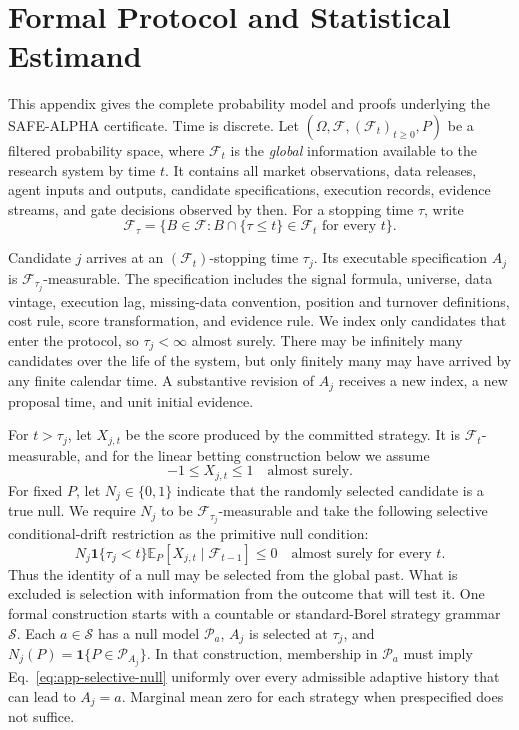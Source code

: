 \section{Formal Protocol and Statistical Estimand}
\label{app:formal}

This appendix gives the complete probability model and proofs underlying the
SAFE-ALPHA certificate.  Time is discrete.  Let
\((\Omega,\mathcal F,(\mathcal F_t)_{t\geq 0},P)\) be a filtered probability
space, where \(\mathcal F_t\) is the \emph{global} information available to
the research system by time \(t\).  It contains all market observations,
data releases, agent inputs and outputs, candidate specifications, execution
records, evidence streams, and gate decisions observed by then.  For a
stopping time \(\tau\), write
\[
  \mathcal F_\tau
  =\{B\in\mathcal F:B\cap\{\tau\leq t\}\in\mathcal F_t
    \text{ for every }t\}.
\]

Candidate \(j\) arrives at an \((\mathcal F_t)\)-stopping time \(\tau_j\).
Its executable specification \(A_j\) is
\(\mathcal F_{\tau_j}\)-measurable.  The specification includes the signal
formula, universe, data vintage, execution lag, missing-data convention,
position and turnover definitions, cost rule, score transformation, and
evidence rule.  We index only candidates that enter the protocol, so
\(\tau_j<\infty\) almost surely.  There may be infinitely many candidates
over the life of the system, but only finitely many may have arrived by any
finite calendar time.  A substantive revision of \(A_j\) receives a new
index, a new proposal time, and unit initial evidence.

For \(t>\tau_j\), let \(X_{j,t}\) be the score produced by the committed
strategy.  It is \(\mathcal F_t\)-measurable, and for the linear betting
construction below we assume
\begin{equation}
  -1\leq X_{j,t}\leq 1\quad\text{almost surely}.
  \label{eq:app-bounded}
\end{equation}
For fixed \(P\), let \(N_j\in\{0,1\}\) indicate that the randomly selected
candidate is a true null.  We require \(N_j\) to be
\(\mathcal F_{\tau_j}\)-measurable and take the following selective
conditional-drift restriction as the primitive null condition:
\begin{equation}
  N_j\mathbf 1\{\tau_j<t\}
  \mathbb E_P[X_{j,t}\mid\mathcal F_{t-1}]\leq 0
  \quad\text{almost surely for every }t.
  \label{eq:app-selective-null}
\end{equation}
Thus the identity of a null may be selected from the global past.  What is
excluded is selection with information from the outcome that will test it.
One formal construction starts with a countable or standard-Borel strategy
grammar \(\mathcal S\).  Each \(a\in\mathcal S\) has a null model
\(\mathcal P_a\), \(A_j\) is selected at \(\tau_j\), and
\(N_j(P)=\mathbf 1\{P\in\mathcal P_{A_j}\}\).  In that construction,
membership in \(\mathcal P_a\) must imply
Eq.~\eqref{eq:app-selective-null} uniformly over every admissible adaptive
history that can lead to \(A_j=a\).  Marginal mean zero for each strategy
when prespecified does not suffice.

